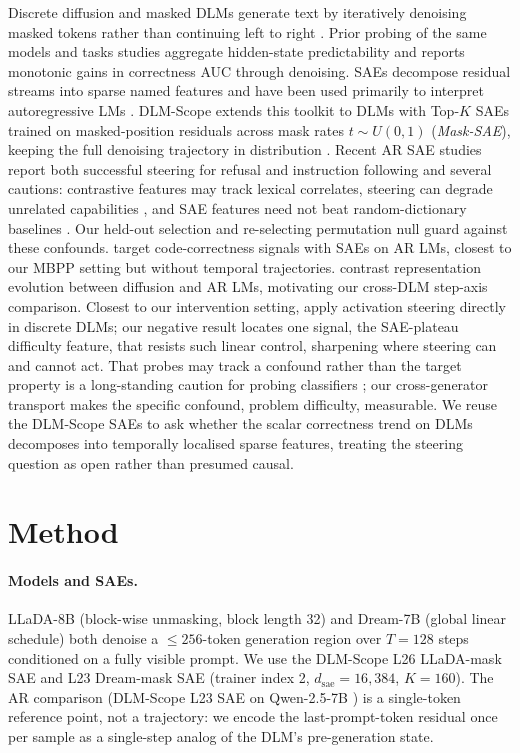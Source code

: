 \documentclass[11pt]{article}
\begin{document}
Discrete diffusion and masked DLMs generate text by iteratively denoising masked tokens rather than continuing left to right \citep{austin2021d3pm,sahoo2024simple,lou2024discrete,nie2025llada,ye2025dream}. Prior probing of the same models and tasks studies aggregate hidden-state predictability and reports monotonic gains in correctness AUC through denoising.
SAEs decompose residual streams into sparse named features and have been used primarily to interpret autoregressive LMs \citep{bricken2023monosemanticity,cunningham2024sae,gao2024scaling}. DLM-Scope extends this toolkit to DLMs with Top-$K$ SAEs \citep{makhzani2014topk,gao2024scaling} trained on masked-position residuals across mask rates $t\!\sim\!U(0,1)$ (\emph{Mask-SAE}), keeping the full denoising trajectory in distribution \citep{dlmscope2026}.
Recent AR SAE studies report both successful steering for refusal and instruction following \citep{obrien2024refusal,he2025saif} and several cautions: contrastive features may track lexical correlates, steering can degrade unrelated capabilities \citep{galichin2025reasoning,korznikov2025roguescalpel}, and SAE features need not beat random-dictionary baselines \citep{korznikov2026sanity}. Our held-out selection and re-selecting permutation null guard against these confounds. \citet{tahimic2025correctness} target code-correctness signals with SAEs on AR LMs, closest to our MBPP setting but without temporal trajectories. \citet{goel2026skip} contrast representation evolution between diffusion and AR LMs, motivating our cross-DLM step-axis comparison.
Closest to our intervention setting, \citet{shnaidman2025steering} apply activation steering directly in discrete DLMs; our negative result locates one signal, the SAE-plateau difficulty feature, that resists such linear control, sharpening where steering can and cannot act.
That probes may track a confound rather than the target property is a long-standing caution for probing classifiers \citep{belinkov2022probing}; our cross-generator transport makes the specific confound, problem difficulty, measurable.
We reuse the DLM-Scope SAEs to ask whether the scalar correctness trend on DLMs decomposes into temporally localised sparse features, treating the steering question as open rather than presumed causal.

\section{Method}
\label{sec:method}

\paragraph{Models and SAEs.}
LLaDA-8B \citep{nie2025llada} (block-wise unmasking, block length 32) and Dream-7B \citep{ye2025dream} (global linear schedule) both denoise a $\!\le\!256$-token generation region over $T{=}128$ steps conditioned on a fully visible prompt.
We use the DLM-Scope L26 LLaDA-mask SAE and L23 Dream-mask SAE (trainer index 2, $d_{\mathrm{sae}}{=}16{,}384$, $K{=}160$).
The AR comparison (DLM-Scope L23 SAE on Qwen-2.5-7B \citep{qwen2.5}) is a single-token reference point, not a trajectory: we encode the last-prompt-token residual once per sample as a single-step analog of the DLM's pre-generation state.
\end{document}
